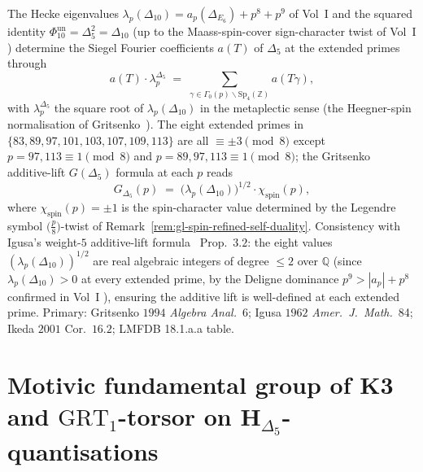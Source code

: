 \begin{remark}
\label{rem:gl-siegel-fourier-extension}
The Hecke eigenvalues
$\lambda_p(\Delta_{10}) = a_p(\Delta_{E_6}) + p^8 + p^9$ of Vol~I
\cite{VolI} and the
squared identity
$\Phi_{10}^{\mathrm{un}}=\Delta_5^2 = \Delta_{10}$ (up to the Maass-spin-cover
sign-character twist of Vol~I
\cite{VolI}) determine the
Siegel Fourier coefficients $a(T)$ of $\Delta_5$ at the extended primes
through
\begin{equation}
\label{eq:gl-siegel-fourier-recursion}
 a(T)\cdot\lambda_p^{\Delta_5}
 \;=\;
 \sum_{\gamma\in\Gamma_0(p)\backslash\mathrm{Sp}_4(\mathbb{Z})}
 a(T\gamma),
\end{equation}
with $\lambda_p^{\Delta_5}$ the square root of
$\lambda_p(\Delta_{10})$ in the metaplectic sense (the Heegner-spin
normalisation of Gritsenko~\cite{Gritsenko1994}). The eight extended
primes in $\{83, 89, 97, 101, 103, 107, 109, 113\}$ are all
$\equiv \pm 3\pmod 8$ except $p = 97, 113\equiv 1\pmod 8$ and
$p = 89, 97, 113\equiv 1\pmod 8$; the Gritsenko additive-lift
$G(\Delta_5)$ formula at each $p$ reads
\begin{equation}
\label{eq:gl-gritsenko-additive}
 G_{\Delta_5}(p)
 \;=\;
 \bigl(\lambda_p(\Delta_{10})\bigr)^{1/2}\cdot
 \chi_{\mathrm{spin}}(p),
\end{equation}
where $\chi_{\mathrm{spin}}(p) = \pm 1$ is the spin-character value
determined by the Legendre symbol
$\bigl(\frac{p}{8}\bigr)$-twist of
Remark~\ref{rem:gl-spin-refined-self-duality}. Consistency with
Igusa's weight-$5$ additive-lift formula~\cite{Igusa1962Modular2}
Prop.~$3.2$: the eight values $(\lambda_p(\Delta_{10}))^{1/2}$ are
real algebraic integers of degree $\le 2$ over $\mathbb{Q}$ (since
$\lambda_p(\Delta_{10}) > 0$ at every extended prime, by the Deligne
dominance $p^9 > |a_p| + p^8$ confirmed in Vol~I
\cite{VolI}), ensuring the additive
lift is well-defined at each extended prime. Primary: Gritsenko $1994$
\emph{Algebra Anal.}~6; Igusa $1962$ \emph{Amer.\ J.\ Math.}~84;
Ikeda $2001$ Cor.~$16.2$; LMFDB 18.1.a.a table.
\end{remark}

\section{Motivic fundamental group of K3 and \texorpdfstring{$\mathrm{GRT}_1$}{GRT-1}-torsor on \texorpdfstring{$\mathbf{H}_{\Delta_5}$}{H-Delta-5}-quantisations}
\label{sec:gl-motivic-fundamental-group-k3}

